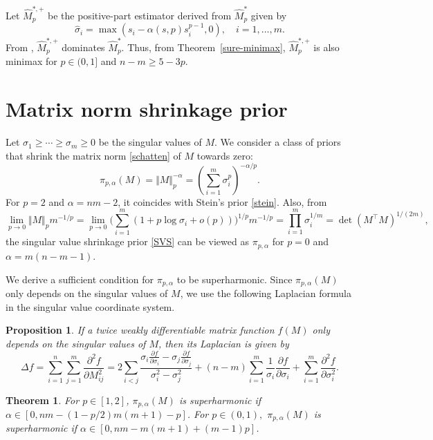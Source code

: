 \documentclass[11pt, a4paper]{article}
\newtheorem{theorem}{Theorem}
\newtheorem{proposition}{Proposition}
\theoremstyle{remark}
\begin{document}
Let $\hat{M}^{*,+}_p$ be the positive-part estimator derived from $\hat{M}^{*}_p$ given by
\[
\hat\sigma_i=\max\left( s_i-\alpha( s,p) s_i^{p-1}, 0\right), \quad i=1,\dots,m.
\]
From \cite{tsukuma2008admissibility}, $\hat{M}^{*,+}_p$ dominates $\hat{M}^{*}_p$.
Thus, from Theorem~\ref{sure-minimax}, $\hat{M}^{*,+}_p$ is also minimax for $p\in(0,1]$ and $n-m\ge5-3p.$


\section{Matrix norm shrinkage prior}\label{sec:prior}
Let $\sigma_1 \geq \cdots \geq \sigma_m \geq 0$ be the singular values of $M$.
We consider a class of priors that shrink the matrix norm \eqref{schatten} of $M$ towards zero:
\[
\pi_{p,\alpha}(M)=\Vert M\Vert_{p}^{-\alpha}=\left( \sum_{i=1}^m \sigma_i^p \right)^{-\alpha/p}.
\]
For $p=2$ and $\alpha=nm-2$, it coincides with Stein's prior \eqref{stein}. 
Also, from
$$\lim_{p\to 0}\Vert M\Vert_{p}m^{-1/p}=\lim_{p\to 0}\Big(\sum_{i=1}^m(1+p\log\sigma_i+o(p)) \Big)^{1/p}m^{-1/p}=\prod_{i=1}^m\sigma_i^{1/m}=\det(M^\top M)^{1/(2m)},$$
the singular value shrinkage prior \eqref{SVS} can be viewed as $\pi_{p,\alpha}$ for $p=0$ and $\alpha=m(n-m-1)$. 

We derive a sufficient condition for $\pi_{p,\alpha}$ to be superharmonic. 
Since $\pi_{p,\alpha}(M)$ only depends on the singular values of $M$, we use the following Laplacian formula in the singular value coordinate system. 

\begin{proposition}\citep{stein1974estimation, matsuda2019improved}\label{matrix-lapla}
If a twice weakly differentiable matrix function $f(M)$ only depends on the singular values of $M$, then its Laplacian is given by
\[
\Delta f=\sum_{i=1}^n\sum_{j=1}^m\frac{\partial^2 f}{\partial M_{ij}^2}
=2\sum_{i<j}\frac{\sigma_i\frac{\partial f}{\partial \sigma_i}-\sigma_j\frac{\partial f}{\partial \sigma_j}}{\sigma_i^2-\sigma_j^2}+(n-m)\sum_{i=1}^m\frac{1}{\sigma_i}\frac{\partial f}{\partial \sigma_i}+\sum_{i=1}^m\frac{\partial^2 f}{\partial \sigma_i^2}.
\]
\end{proposition}

\begin{theorem} \label{norm-harmonic}
For $p\in[1,2]$, $\pi_{p,\alpha}(M)$ is superharmonic if $\alpha\in[0,nm-(1-p/2)m(m+1)-p]$. 
For $p\in(0,1),$ $\pi_{p,\alpha}(M)$ is superharmonic if $\alpha\in[0,nm-m(m+1)+(m-1)p]$.
\end{theorem}
\end{document}
